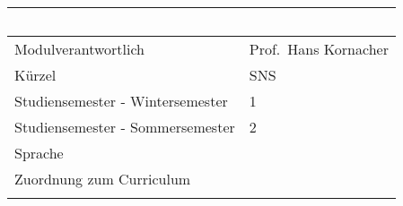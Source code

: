\begin{longtable}[]{@{}ll@{}}
\toprule
\begin{minipage}[b]{0.12\columnwidth}\raggedright\strut
~\strut
\end{minipage} & \begin{minipage}[b]{0.12\columnwidth}\raggedright\strut
~\strut
\end{minipage}\tabularnewline
\midrule
\endhead
\begin{minipage}[t]{0.12\columnwidth}\raggedright\strut
Modulverantwortlich\strut
\end{minipage} & \begin{minipage}[t]{0.12\columnwidth}\raggedright\strut
Prof.~Hans Kornacher\strut
\end{minipage}\tabularnewline
\begin{minipage}[t]{0.12\columnwidth}\raggedright\strut
Kürzel\strut
\end{minipage} & \begin{minipage}[t]{0.12\columnwidth}\raggedright\strut
SNS\strut
\end{minipage}\tabularnewline
\begin{minipage}[t]{0.12\columnwidth}\raggedright\strut
Studiensemester - Wintersemester\strut
\end{minipage} & \begin{minipage}[t]{0.12\columnwidth}\raggedright\strut
1\strut
\end{minipage}\tabularnewline
\begin{minipage}[t]{0.12\columnwidth}\raggedright\strut
Studiensemester - Sommersemester\strut
\end{minipage} & \begin{minipage}[t]{0.12\columnwidth}\raggedright\strut
2\strut
\end{minipage}\tabularnewline
\begin{minipage}[t]{0.12\columnwidth}\raggedright\strut
Sprache\strut
\end{minipage} & \begin{minipage}[t]{0.12\columnwidth}\raggedright\strut
~\strut
\end{minipage}\tabularnewline
\begin{minipage}[t]{0.12\columnwidth}\raggedright\strut
Zuordnung zum Curriculum\strut
\end{minipage} & \begin{minipage}[t]{0.12\columnwidth}\raggedright\strut
~\strut
\end{minipage}\tabularnewline
\begin{minipage}[t]{0.12\columnwidth}\raggedright\strut

\end{minipage}
\end{longtable}
